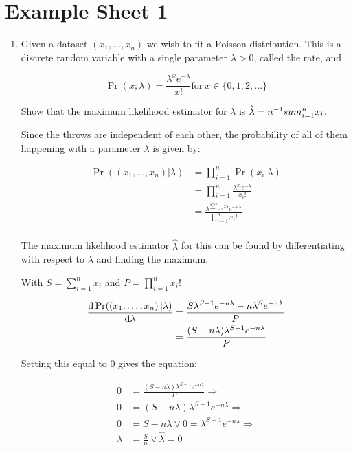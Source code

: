 \documentclass[10pt,\jkfside,a4paper]{article}
\begin{document}
\section{Example Sheet 1}

\begin{enumerate}

\item Given a dataset $\left(x_1,\ldots, x_n\right)$ we wish to fit a Poisson
distribution. This is a discrete random variable with a single parameter
$\lambda > 0$, called the rate, and

\[
\Pr\left( x ; \lambda \right) = \frac{\lambda^x e^{-\lambda}}{x!} \text{for}
 \ x \in\{0, 1, 2, \dots \}
\]

Show that the maximum likelihood estimator for $\lambda$ is $\hat{\lambda} =
n^{-1} \\sum^{n}_{i=1} x_i$.

Since the throws are independent of each other, the probability of all of
them happening with a parameter $\lambda$ is given by:

\[
\begin{split}
\Pr(\left( x_1,\ldots, x_n \right) | \lambda) &= \prod^n_{i=1} \Pr(x_i |
\lambda) \\
&= \prod^n_{i=1} \frac{\lambda^{x_i}e^{-\lambda}}{x_i!} \\
&= \frac{\lambda^{\sum^{n}_{i=1} x_I}e^{-n\lambda}}{\prod^n_{i=1} x_i!} \\
\end{split}
\]

The maximum likelihood estimator $\hat{\lambda}$ for this can be found by
differentiating with respect to $\lambda$ and finding the maximum.

With $S = \sum^{n}_{i=1}x_i  $ and $P = \prod^n_{i=1} x_i! $

\[
\begin{split}
\dv{\Pr(\left( x_1,\ldots, x_n \right) | \lambda)}{\lambda}
&=
\frac{S \lambda^{S-1}e^{-n\lambda} - n\lambda^S e^{-n\lambda}}{P} \\
&=
\frac{(S - n\lambda)\lambda^{S-1}e^{-n\lambda}}{P} \\
\end{split}
\]

Setting this equal to 0 gives the equation:

\[
\begin{split}
0 &=
\frac{(S - n\lambda)\lambda^{S-1}e^{-n\lambda}}{P} \Longrightarrow \\
0 &= (S - n\lambda)\lambda^{S-1}e^{-n\lambda} \Longrightarrow \\
0 &= S - n\lambda \vee 0 = \lambda^{S-1}e^{-n\lambda} \Longrightarrow \\
\lambda &= \frac{S}{n} \vee \hat{\lambda} = 0 \\
\end{split}
\]


\end{enumerate}
\end{document}
